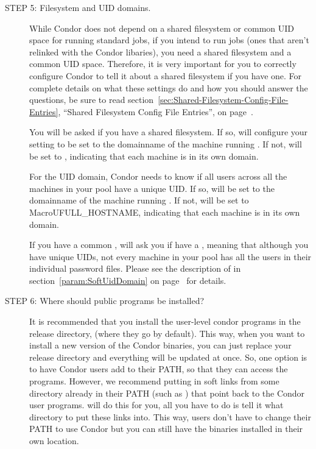 \begin{description}
\item[STEP 5: Filesystem and UID domains.]

     While Condor does not depend on a shared filesystem or common UID
     space for running standard jobs, if you intend to run
      jobs (ones that aren't relinked with the Condor
     libaries), you need a shared filesystem and a common UID space.  
     Therefore, it is very important for you to correctly configure
     Condor to tell it about a shared filesystem if you have one.
     For complete details on what these settings do and how you
     should answer the questions, be sure to read
     section~\ref{sec:Shared-Filesystem-Config-File-Entries},
     ``Shared Filesystem Config File Entries'', on
     page~\pageref{sec:Shared-Filesystem-Config-File-Entries}.

     You will be asked if you have a shared filesystem.  If so,
      will configure your  
     setting to be set to the domainname of the machine running
     .
     If not,  will be set to
     , indicating that each machine is in its
     own domain.

     For the UID domain, Condor needs to know if all users across all
     the machines in your pool have a unique UID.  
     If so,  will be set to the domainname of the
     machine running . 
     If not,  will be set to
     MacroU{FULL\_HOSTNAME}, indicating that each machine is in its 
     own domain.

     If you have a common ,  will
     ask you if have a , meaning that although
     you have unique UIDs, not every machine in your pool has all the
     users in their individual password files.  Please see the
     description of  in
     section~\ref{param:SoftUidDomain} on
     page~\pageref{param:SoftUidDomain} for details.  

\item[STEP 6: Where should public programs be installed?]

     It is recommended that you install the user-level condor programs
     in the release directory, (where they go by default).  This way,
     when you want to install a new version of the Condor binaries,
     you can just replace your release directory and everything will
     be updated at once.  So, one option is to have Condor users add
      to their PATH, so that they can access the
     programs.  However, we recommend putting in soft links from some
     directory already in their PATH (such as ) that
     point back to the Condor user programs.   will do
     this for you, all you have to do is tell it what directory to put
     these links into.  This way, users don't have to change their
     PATH to use Condor but you can still have the binaries installed
     in their own location.


\end{description}
